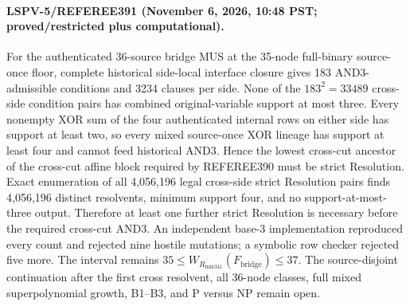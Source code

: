 \paragraph{LSPV-5/REFEREE391 (November 6, 2026, 10:48 PST; proved/restricted plus computational).}
For the authenticated 36-source bridge MUS at the 35-node full-binary source-once floor, complete historical side-local interface closure gives 183 AND3-admissible conditions and 3234 clauses per side.  None of the $183^2=33489$ cross-side condition pairs has combined original-variable support at most three.  Every nonempty XOR sum of the four authenticated internal rows on either side has support at least two, so every mixed source-once XOR lineage has support at least four and cannot feed historical AND3.  Hence the lowest cross-cut ancestor of the cross-cut affine block required by REFEREE390 must be strict Resolution.  Exact enumeration of all 4,056,196 legal cross-side strict Resolution pairs finds 4,056,196 distinct resolvents, minimum support four, and no support-at-most-three output.  Therefore at least one further strict Resolution is necessary before the required cross-cut AND3.  An independent base-3 implementation reproduced every count and rejected nine hostile mutations; a symbolic row checker rejected five more.  The interval remains $35\le W_{R_{\mathrm{mix341}}}(F_{\mathrm{bridge}})\le37$.  The source-disjoint continuation after the first cross resolvent, all 36-node classes, full mixed superpolynomial growth, B1--B3, and P versus NP remain open.
